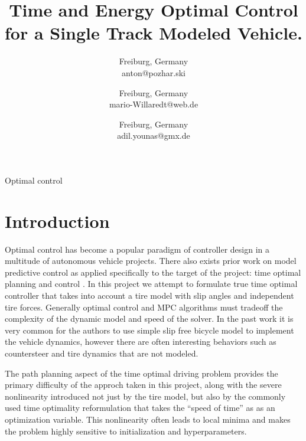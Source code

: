 \documentclass[conference,11pt]{IEEEtran}
\begin{document}
\title{Time and Energy Optimal Control for a Single Track Modeled Vehicle.}

\author{
Freiburg, Germany \\
anton@pozhar.ski
\and
{}
Freiburg, Germany \\
mario-Willaredt@web.de
\and
{}
Freiburg, Germany \\
adil.younas@gmx.de
}

\maketitle

\begin{abstract}
  
\end{abstract}

\begin{IEEEkeywords}
Optimal control
\end{IEEEkeywords}

\section{Introduction}
Optimal control has become a popular paradigm of controller design in a multitude of autonomous vehicle projects. There also exists prior work on model predictive control as applied specifically
to the target of the project: time optimal planning and control \cite{Verschueren2014a}\cite{LOT20147559}. In this project we attempt to formulate true time optimal controller that takes into
account a tire model with slip angles and independent tire forces. Generally optimal control and MPC algorithms must tradeoff the complexity of the dynamic model and speed of the solver. In the
past work it is very common for the authors to use simple slip free bicycle model to implement the vehicle dynamics, however there are often interesting behaviors such as countersteer and tire
dynamics that are not modeled.

The path planning aspect of the time optimal driving problem provides the primary difficulty of the approch taken in this project, along with the severe nonlinearity introduced not just by the
tire model, but also by the commonly used time optimality reformulation that takes the ``speed of time'' as as an optimization variable. This nonlinearity often leads to local minima and makes the
problem highly sensitive to initialization and hyperparameters.
\end{document}
